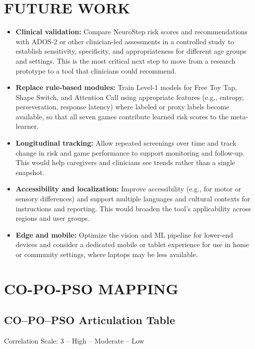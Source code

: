 \documentclass[12pt,a4paper]{report}
\begin{document}
\chapter*{FUTURE WORK}
\begin{itemize}
    \item \textbf{Clinical validation:} Compare NeuroStep risk scores and recommendations with ADOS-2 or other clinician-led assessments in a controlled study to establish sensitivity, specificity, and appropriateness for different age groups and settings. This is the most critical next step to move from a research prototype to a tool that clinicians could recommend.
    \item \textbf{Replace rule-based modules:} Train Level-1 models for Free Toy Tap, Shape Switch, and Attention Call using appropriate features (e.g., entropy, perseveration, response latency) where labeled or proxy labels become available, so that all seven games contribute learned risk scores to the meta-learner.
    \item \textbf{Longitudinal tracking:} Allow repeated screenings over time and track change in risk and game performance to support monitoring and follow-up. This would help caregivers and clinicians see trends rather than a single snapshot.
    \item \textbf{Accessibility and localization:} Improve accessibility (e.g., for motor or sensory differences) and support multiple languages and cultural contexts for instructions and reporting. This would broaden the tool's applicability across regions and user groups.
    \item \textbf{Edge and mobile:} Optimize the vision and ML pipeline for lower-end devices and consider a dedicated mobile or tablet experience for use in home or community settings, where laptops may be less available.
\end{itemize}
\chapter*{CO-PO-PSO MAPPING}
\section{CO–PO–PSO Articulation Table}

Correlation Scale: 3 -- High  -- Moderate  -- Low
\end{document}
